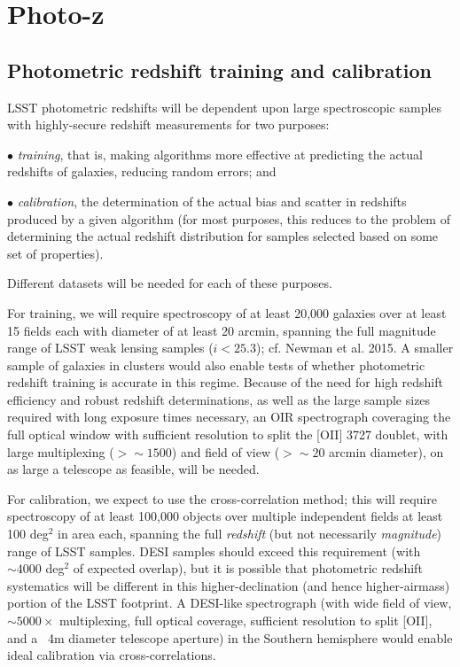 
\section{Photo-z}
\label{sec:photoz}

\subsection{Photometric redshift training and calibration}\label{subsec:training}

LSST photometric redshifts will be dependent upon large spectroscopic samples with highly-secure redshift measurements for two purposes: 

$\bullet$ {\it training}, that is, making algorithms more effective at predicting the actual redshifts of galaxies, reducing random errors; and 

$\bullet$ {\it calibration}, the determination of the actual bias and scatter in redshifts produced by a given algorithm (for most purposes, this reduces to the problem of determining the actual redshift distribution for samples selected based on some set of properties).  

Different datasets will be needed for each of these purposes.

For training, we will require spectroscopy of at least 20,000 galaxies over at least 15 fields each with diameter of at least 20 arcmin, spanning the full magnitude range of LSST weak lensing samples ($i<25.3$); cf. Newman et al. 2015.  A smaller sample of galaxies in clusters would also enable tests of whether photometric redshift training is accurate in this regime.  Because of the need for high redshift efficiency and robust redshift determinations, as well as the large sample sizes required with long exposure times necessary, an OIR spectrograph coveraging the full optical window with sufficient resolution to split the [OII] 3727 doublet, with large multiplexing ($>\sim 1500$) and field of view ($>\sim 20$ arcmin diameter), on as large a telescope as feasible, will be needed.  

For calibration, we expect to use the cross-correlation method; this will require spectroscopy of at least 100,000 objects over multiple independent fields at least 100 deg$^2$ in area each, spanning the full {\em redshift} (but not necessarily {\em magnitude}) range of LSST samples.  DESI samples should exceed this requirement (with $\sim 4000$ deg$^2$ of expected overlap), but it is possible that photometric redshift systematics will be different in this higher-declination (and hence higher-airmass) portion of the LSST footprint.   A DESI-like spectrograph (with wide field of view, $\sim 5000\times$ multiplexing, full optical coverage, sufficient resolution to split [OII], and a ~4m diameter telescope aperture) in the Southern hemisphere would enable ideal calibration via cross-correlations.  

